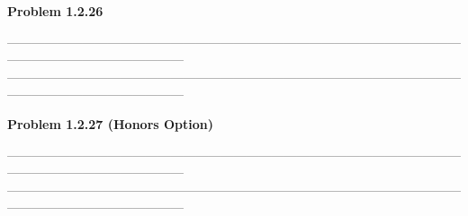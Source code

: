 \documentclass{article}
\newcommand{\Problem}[1]{\textbf{Problem #1}}
\begin{document}
\Problem{1.2.26}

------------------------------------------------------------------------------------------------------------------------------------------------------
------------------------------------------------------------------------------------------------------------------------------------------------------

\Problem{1.2.27 (Honors Option)}

------------------------------------------------------------------------------------------------------------------------------------------------------
------------------------------------------------------------------------------------------------------------------------------------------------------


	
\end{document}
